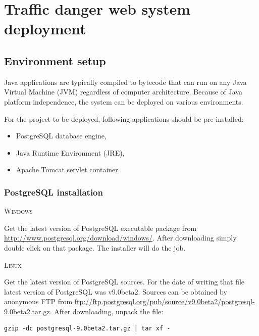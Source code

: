 \setlength{\parindent}{0in}	%

\chapter{Traffic danger web system deployment}
\label{cha:systemDeployment}

\section{Environment setup}
\label{sec:environmentSetup}

Java applications are typically compiled to bytecode that can run on any Java Virtual Machine (JVM) regardless of computer architecture. Because of Java platform independence, the system can be deployed on various environments.

\bigskip

For the project to be deployed, following applications should be pre-installed:
\begin{itemize}
    \setlength{\itemsep}{0cm}
    \setlength{\parskip}{0cm}

    \item PostgreSQL database engine,
    \item Java Runtime Environment (JRE),
    \item Apache Tomcat servlet container.
\end{itemize}

\subsection{PostgreSQL installation}
\label{sub:postgreSQLInstallation}

{\scshape Windows}
\smallskip

Get the latest version of PostgreSQL executable package from \url{http://www.postgresql.org/download/windows/}. After downloading simply double click on that package. The installer will do the job.

\bigskip

{\scshape Linux}
\smallskip

Get the latest version of PostgreSQL sources. For the date of writing that file latest version of PostgreSQL was v9.0beta2. Sources can be obtained by anonymous FTP from \url{ftp://ftp.postgresql.org/pub/source/v9.0beta2/postgresql-9.0beta2.tar.gz}. After downloading, unpack the file:
\begin{verbatim}
gzip -dc postgresql-9.0beta2.tar.gz | tar xf -
\end{verbatim}

